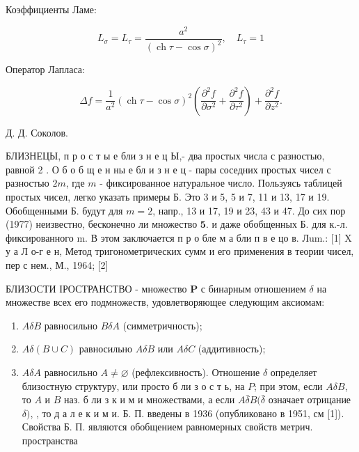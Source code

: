 \documentclass[10pt]{article}
\begin{document}
Коэффициенты Ламе:



\[

L_{\sigma}=L_{\tau}=\frac{a^{2}}{(\operatorname{ch} \tau-\cos \sigma)^{2}}, \quad L_{\tau}=1

\]



Оператор Лапласа:



\[

\Delta f=\frac{1}{a^{2}}(\operatorname{ch} \tau-\cos \sigma)^{2}\left(\frac{\partial^{2} f}{\partial \sigma^{2}}+\frac{\partial^{2} f}{\partial \tau^{2}}\right)+\frac{\partial^{2} f}{\partial z^{2}} .

\]



Д. Д. Соколов.



БЛИЗНЕЦЫ, п р о с т ы е бли з н е ц Ы,- два простых числа с разностью, равной 2 . О б о б щ е н ны е бл и з н е ц - пары соседних простых чисел с разностью $2 m$, где $m$ - фиксированное натуральное число. Пользуясь таблицей простых чисел, легко указать примеры Б. Это 3 и 5, 5 и 7, 11 и 13, 17 и 19. Обобщенными Б. будут для $m=2$, напр., 13 и 17, 19 и 23, 43 и 47. До сих пор (1977) неизвестно, бесконечно ли множество $\mathbf{5}$. и даже обобщенных Б. для к.-л. фиксированного $\mathrm{m}$. В этом заключается п р о бле м а бли п в е цо в. Лum.: [1] X у а Л о-г е н, Метод тригонометрических сумм и его применения в теории чисел, пер с нем., М., 1964; [2]



БЛИЗОСТИ ІРОСТРАНСТВО - множество $\boldsymbol{P}$ с бинарным отношением $\delta$ на множестве всех его подмножеств, удовлетворяющее следующим аксиомам:



\begin{enumerate}

  \item $A \delta B$ равносильно $B \delta A$ (симметричность);



  \item $A \delta(B \cup C)$ равносильно $A \delta B$ или $A \delta C$ (аддитивность);



  \item $A \delta A$ равносильно $A \neq \varnothing$ (рефлексивность). Отношение $\delta$ определяет близостную структуру, или просто б ли з о с т ь, на $P$; при этом, если $A \delta B$, то $A$ и $B$ наз. б ли з к и м и множествами, а если $A \bar{\delta} B(\bar{\delta}$ означает отрицание $\delta)$, , то д а л е к и м и. Б. П. введены в 1936 (опубликовано в 1951, см [1]). Свойства Б. П. являются обобщением равномерных свойств метрич. пространства



\end{enumerate}
\end{document}
